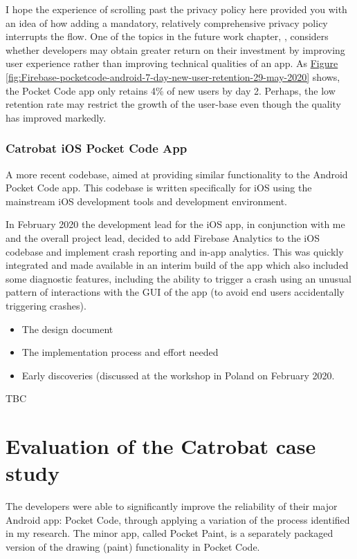 I hope the experience of scrolling past the privacy policy here provided you with an idea of how adding a mandatory, relatively comprehensive privacy policy interrupts the flow. One of the topics in the future work chapter, \href{enhancing-quality-vs-enhancing-ux}{\textit{}}, considers whether developers may obtain greater return on their investment by improving user experience rather than improving technical qualities of an app. As \href{enhancing-quality-vs-enhancing-ux}{Figure \ref{fig:Firebase-pocketcode-android-7-day-new-user-retention-29-may-2020}} shows, the Pocket Code app only retains 4\% of new users by day 2. Perhaps, the low retention rate may restrict the growth of the user-base even though the quality has improved markedly.

\subsubsection{Catrobat iOS Pocket Code App}
A more recent codebase, aimed at providing similar functionality to the Android Pocket Code app. This codebase is written specifically for iOS using the mainstream iOS development tools and development environment. 

In February 2020 the development lead for the iOS app, in conjunction with me and the overall project lead, decided to add Firebase Analytics to the iOS codebase and implement crash reporting and in-app analytics. This was quickly integrated and made available in an interim build of the app which also included some diagnostic features, including the ability to trigger a crash using an unusual pattern of interactions with the GUI of the app (to avoid end users accidentally triggering crashes).


\begin{itemize}
    \item The design document
    \item The implementation process and effort needed
    \item Early discoveries (discussed at the workshop in Poland on  February 2020.
\end{itemize}
TBC

\section{Evaluation of the Catrobat case study}
The developers were able to significantly improve the reliability of their major Android app: Pocket Code, through applying a variation of the process identified in my research. The minor app, called Pocket Paint, is a separately packaged version of the drawing (paint) functionality in Pocket Code.

